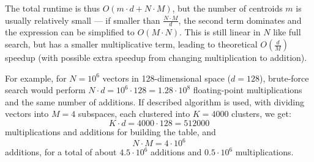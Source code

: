 The total runtime is thus $O(m \cdot d + N \cdot M)$, but the number of centroids $m$ is usually 
relatively small --- if smaller than $\frac{N \cdot M}{d}$, the second term dominates 
and the expression can be simplified to
$O(M \cdot N)$. This is still linear in $N$ like full search, but has a smaller multiplicative
term, leading to theoretical $O(\frac{d}{M})$ speedup (with possible extra speedup from changing
multiplication to addition).

For example, for $N = 10^6$ vectors in 128-dimensional space ($d = 128$), brute-force search would
perform $N \cdot d = 10^6 \cdot 128 = 1.28 \cdot 10^8$ floating-point multiplications and the same
number of additions. If described algorithm is used, with dividing vectors into $M = 4$ subspaces,
each clustered into $K = 4000$ clusters, we get:
$$ K \cdot d = 4000 \cdot 128 = 512000 $$
multiplications and additions for building the table, and
$$ N \cdot M = 4 \cdot 10^6 $$ additions, for a total of about $4.5 \cdot 10^6$ additions and 
$0.5 \cdot 10^6$ multiplications.
